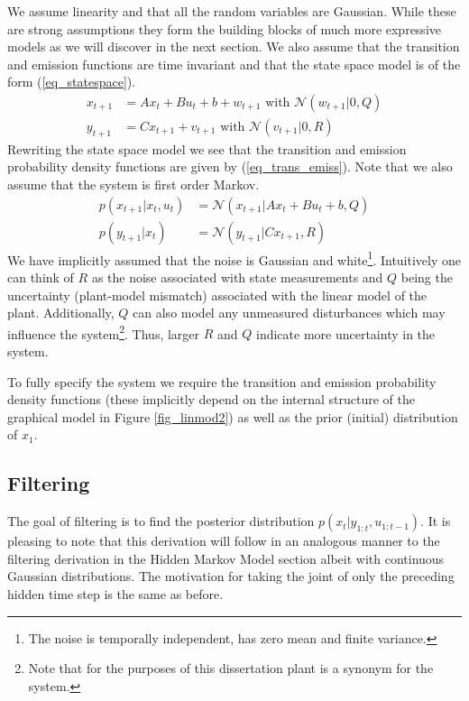 \documentclass[../masters.tex]{subfiles}
\begin{document}
We assume linearity and that all the random variables are Gaussian. While these are strong assumptions they form the building blocks of much more expressive models as we will discover in the next section. We also assume that the transition and emission functions are time invariant and that the state space model is of the form (\ref{eq_statespace}).
\begin{equation}
\begin{aligned}
x_{t+1} &= Ax_t + Bu_t + b + w_{t+1} \text{ with } \mathcal{N}(w_{t+1}|0,Q) \\
y_{t+1} &= Cx_{t+1} + v_{t+1}  \text{ with } \mathcal{N}(v_{t+1}|0,R)
\end{aligned}
\label{eq_statespace}
\end{equation}
Rewriting the state space model we see that the transition and emission probability density functions are given by (\ref{eq_trans_emiss}). Note that we also assume that the system is first order Markov.
\begin{equation}
\begin{aligned}
p(x_{t+1}|x_t, u_t)&= \mathcal{N}(x_{t+1}|Ax_t+Bu_t +b, Q) \\
p(y_{t+1}|x_t) &= \mathcal{N}(y_{t+1}|Cx_{t+1}, R)
\end{aligned}
\label{eq_trans_emiss}
\end{equation}
We have implicitly assumed that the noise is Gaussian and white\footnote{The noise is temporally independent, has zero mean and finite variance.}. Intuitively one can think of $R$ as the noise associated with state measurements and $Q$ being the uncertainty (plant-model mismatch) associated with the linear model of the plant. Additionally, $Q$ can also model any unmeasured disturbances which may influence the system\footnote{Note that for the purposes of this dissertation plant is a synonym for the system.}. Thus, larger $R$ and $Q$ indicate more uncertainty in the system. 

To fully specify the system we require the transition and emission probability density functions (these implicitly depend on the internal structure of the graphical model in Figure \ref{fig_linmod2}) as well as the prior (initial) distribution of $x_1$.

\subsection{Filtering}
The goal of filtering is to find the posterior distribution $p(x_{t}|y_{1:t}, u_{1:t-1})$. It is pleasing to note that this derivation will follow in an analogous manner to the filtering derivation in the Hidden Markov Model section albeit with continuous Gaussian distributions. The motivation for taking the joint of only the preceding hidden time step is the same as before. 
\end{document}

